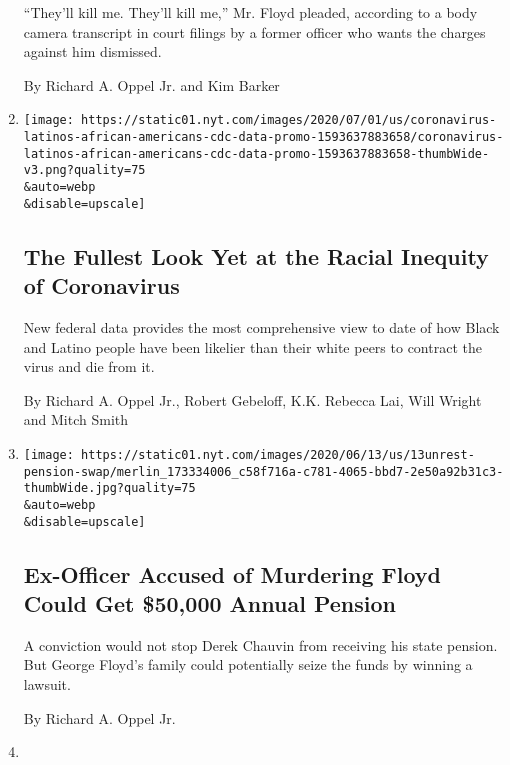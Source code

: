 \begin{enumerate}
  ``They'll kill me. They'll kill me,'' Mr. Floyd pleaded, according to
  a body camera transcript in court filings by a former officer who
  wants the charges against him dismissed.

  By Richard A. Oppel Jr. and Kim Barker
\item
  \href{/interactive/2020/07/05/us/coronavirus-latinos-african-americans-cdc-data.html}{}

  \texttt{[image: https://static01.nyt.com/images/2020/07/01/us/coronavirus-latinos-african-americans-cdc-data-promo-1593637883658/coronavirus-latinos-african-americans-cdc-data-promo-1593637883658-thumbWide-v3.png?quality=75\\\&auto=webp\\\&disable=upscale]}

  \hypertarget{the-fullest-look-yet-at-the-racial-inequity-of-coronavirus}{%
  \subsection{The Fullest Look Yet at the Racial Inequity of
  Coronavirus}\label{the-fullest-look-yet-at-the-racial-inequity-of-coronavirus}}

  New federal data provides the most comprehensive view to date of how
  Black and Latino people have been likelier than their white peers to
  contract the virus and die from it.

  By Richard A. Oppel Jr., Robert Gebeloff, K.K. Rebecca Lai, Will
  Wright and Mitch Smith
\item
  \href{/2020/06/13/us/chauvin-pension-conviction-floyd.html}{}

  \texttt{[image: https://static01.nyt.com/images/2020/06/13/us/13unrest-pension-swap/merlin\_173334006\_c58f716a-c781-4065-bbd7-2e50a92b31c3-thumbWide.jpg?quality=75\\\&auto=webp\\\&disable=upscale]}

  \hypertarget{ex-officer-accused-of-murdering-floyd-could-get-50000-annual-pension}{%
  \subsection{Ex-Officer Accused of Murdering Floyd Could Get \$50,000
  Annual
  Pension}\label{ex-officer-accused-of-murdering-floyd-could-get-50000-annual-pension}}

  A conviction would not stop Derek Chauvin from receiving his state
  pension. But George Floyd's family could potentially seize the funds
  by winning a lawsuit.

  By Richard A. Oppel Jr.
\item
  \href{/2020/06/08/us/unrest-defund-police.html}{}


\end{enumerate}
